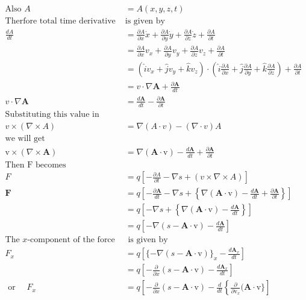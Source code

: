 \begin{align*}
\text{Also }A&=A(x,y,z,t)\\
\text{Therfore total time derivative of A }&\text{is given by}\\
\frac{dA}{dt}&=\frac{\partial A}{\partial x} \dot{x}+\frac{\partial A}{\partial y} \dot{y}+\frac{\partial A}{\partial z} \dot{z}+\frac{\partial A}{\partial t}\\
&=\frac{\partial A}{\partial x} v_x+\frac{\partial A}{\partial y} v_y+\frac{\partial A}{\partial z} v_z+\frac{\partial A}{\partial t}\\
&=(\hat{i}v_x+\hat{j}v_y+\hat{k}v_z)\cdot \left( \hat{i}\frac{\partial A}{\partial x}+\hat{j}\frac{\partial A}{\partial y}+\hat{k}\frac{\partial A}{\partial z}\right) +\frac{\partial A}{\partial t}\\
&=v \cdot \nabla \mathbf{A}+\frac{\partial \mathbf{A}}{d t} \\
v \cdot\nabla \mathbf{A}&=\frac{d \mathbf{A}}{d t}-\frac{\partial \mathbf{A}}{\partial t}\\
\text{Substituting this value in }\\
v\times(\nabla \times A)&=\nabla (A\cdot v)-(\nabla \cdot v)A\\
\text{we will get }\\
\mathrm{v} \times(\nabla \times \mathbf{A})&=\nabla(\mathbf{A} \cdot \mathrm{v})-\frac{d \mathbf{A}}{d t}+\frac{\partial \mathbf{A}}{\partial t}\\
\text{Then F becomes}\\
F&=q\left[ -\frac{\partial A}{\partial t}-\nabla s+(v\times \nabla \times A)\right] \\
\mathbf{F} &=q\left[-\frac{\partial \mathbf{A}}{d t}-\nabla s+\left\{\nabla(\mathbf{A} \cdot \mathrm{v})-\frac{d \mathbf{A}}{d t}+\frac{\partial \mathbf{A}}{\partial t}\right\}\right] \\
&=q\left[-\nabla s+\left\{\nabla(\mathbf{A} \cdot \mathrm{v})-\frac{d \mathbf{A}}{d t}\right\}\right] \\
&=q\left[-\nabla(s-\mathbf{A} \cdot \mathrm{v})-\frac{d \mathbf{A}}{d t}\right]\\
\text{The $x$-component of the force}&\text{ is given by}\\
F_{x} &=q\left[\{-\nabla(s-\mathbf{A} \cdot \mathrm{v})\}_{x}-\frac{d \mathbf{A}_{x}}{d t}\right] \\
&=q\left[-\frac{\partial}{\partial x}(s-\mathbf{A} \cdot \mathrm{v})-\frac{d \mathbf{A}_{x}}{d t}\right] \\
\text { or } \quad F_{x} &=q\left[-\frac{\partial}{\partial x}(s-\mathbf{A} \cdot \mathrm{v})-\frac{d}{d t}\left\{\frac{\partial}{\partial \mathrm{v}_{x}}(\mathbf{A} \cdot \mathrm{v}\}\right]\right.\\

\end{align*}
